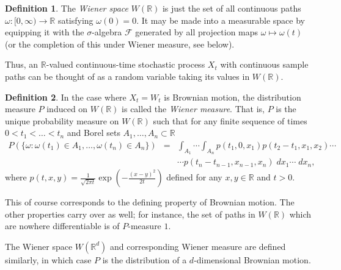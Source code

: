 \documentclass[12pt]{article}
\theoremstyle{definition}
\newtheorem{definition}{Definition}
\begin{document}
\begin{definition}
The \emph{Wiener space} $W(\mathbb{R})$ is just the set of all continuous paths $\omega : [0, \infty) \to \mathbb{R}$ satisfying $\omega(0)=0$.  It may be made into a measurable space by equipping it with the $\sigma$-algebra $\mathcal{F}$ generated by all projection maps $\omega \mapsto \omega(t)$ (or the completion of this under Wiener measure, see below).
\end{definition}

Thus, an $\mathbb{R}$-valued continuous-time stochastic process $X_t$ with continuous sample paths can be thought of as a random variable taking its values in $W(\mathbb{R})$.

\begin{definition}
In the case where $X_t = W_t$ is Brownian motion, the distribution measure $P$ induced on $W(\mathbb{R})$ is called the \emph{Wiener measure}.  That is, $P$ is the unique probability measure on $W(\mathbb{R})$ such that for any finite sequence of times $0<t_1<\ldots<t_n$ and Borel sets $A_1,\ldots,A_n \subset \mathbb{R}$
\begin{eqnarray}
P(\{\omega : \omega(t_1)\in A_1,\ldots,\omega(t_n) \in A_n\}) &=& \int_{A_1}\cdots\int_{A_n} p(t_1,0,x_1)p(t_2-t_1,x_1,x_2)\cdots \\
&& \cdots p(t_n-t_{n-1},x_{n-1},x_n) \; dx_1 \cdots \; dx_n,
\end{eqnarray}
where $p(t,x,y) = \frac{1}{\sqrt{2\pi t}}\exp(-\frac{(x-y)^2}{2t})$ defined for any $x,y\in\mathbb{R}$ and $t>0$.
\end{definition}

This of course corresponds to the defining property of Brownian motion.  The other properties carry over as well; for instance, the set of paths in $W(\mathbb{R})$ which are nowhere differentiable is of $P$-measure $1$.

The Wiener space $W(\mathbb{R}^d)$ and corresponding Wiener measure are defined similarly, in which case $P$ is the distribution of a $d$-dimensional Brownian motion.
\end{document}
